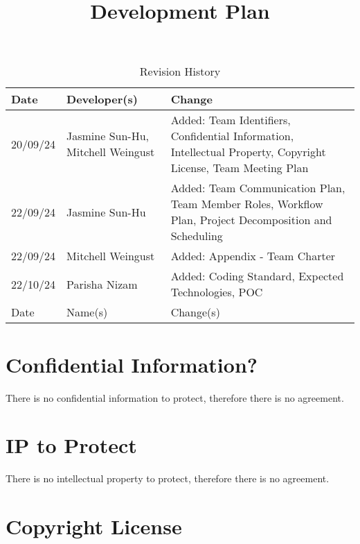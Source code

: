 \documentclass{article}
\title{Development Plan\\\progname}
\author{\authname}
\date{}
\begin{document}
\maketitle

\begin{table}[hp]
\caption{Revision History} \label{TblRevisionHistory}
\begin{tabularx}{\textwidth}{p{1.5cm}p{3cm}X}
\toprule
\textbf{Date} & \textbf{Developer(s)} & \textbf{Change}\\
\midrule
20/09/24 & Jasmine Sun-Hu, Mitchell Weingust & Added: Team Identifiers, Confidential Information, Intellectual Property,
Copyright License, Team Meeting Plan\\
22/09/24 & Jasmine Sun-Hu & Added: Team Communication Plan, Team Member Roles, Workflow Plan, Project Decomposition and Scheduling\\
22/09/24 & Mitchell Weingust & Added: Appendix - Team Charter\\
22/10/24 & Parisha Nizam & Added: Coding Standard, Expected Technologies, POC \\
Date & Name(s) & Change(s)\\
\bottomrule
\end{tabularx}
\end{table}

\newpage{}



\section{Confidential Information?}

There is no confidential information to protect, therefore there is no agreement.

\section{IP to Protect}

There is no intellectual property to protect, therefore there is no agreement.

\section{Copyright License}
\end{document}
